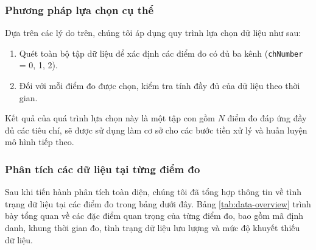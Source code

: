 \subsubsection{Phương pháp lựa chọn cụ thể}
Dựa trên các lý do trên, chúng tôi áp dụng quy trình lựa chọn dữ liệu như sau:

\begin{enumerate}
    \item Quét toàn bộ tập dữ liệu để xác định các điểm đo có đủ ba kênh (\texttt{chNumber} = 0, 1, 2).
    \item Đối với mỗi điểm đo được chọn, kiểm tra tính đầy đủ của dữ liệu theo thời gian.
\end{enumerate}

Kết quả của quá trình lựa chọn này là một tập con gồm $N$ điểm đo đáp ứng đầy đủ các tiêu chí, sẽ được sử dụng làm cơ sở cho các bước tiền xử lý và huấn luyện mô hình tiếp theo.

\subsubsection{Phân tích các dữ liệu tại từng điểm đo}
Sau khi tiến hành phân tích toàn diện, chúng tôi đã tổng hợp thông tin về tình trạng dữ liệu tại các điểm đo trong bảng dưới đây. Bảng \ref{tab:data-overview} trình bày tổng quan về các đặc điểm quan trọng của từng điểm đo, bao gồm mã định danh, khung thời gian đo, tình trạng dữ liệu lưu lượng và mức độ khuyết thiếu dữ liệu.

